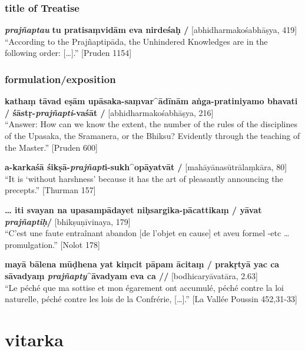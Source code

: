 \documentclass[
  letterpaper,
  DIV=11,
  numbers=noendperiod,
  oneside]{scrreprt}
\begin{document}
\hypertarget{title-of-treatise}{%
\subsection{title of Treatise}\label{title-of-treatise}}

\textbf{\emph{prajñaptau}} \textbf{tu pratisaṃvidām eva nirdeśaḥ /}
{[}abhidharmakośabhāṣya, 419{]}\\
``According to the Prajñaptipāda, the Unhindered Knowledges are in the
following order: {[}\ldots{]}.'' {[}Pruden 1154{]}

\hypertarget{formulationexposition}{%
\subsection{formulation/exposition}\label{formulationexposition}}

\textbf{kathaṃ tāvad eṣām upāsaka-saṃvar\^{}ādīnām aṅga-pratiniyamo
bhavati / śāstṛ-\emph{prajñapti}-vaśāt /} {[}abhidharmakośabhāṣya,
216{]}\\
``Answer: How can we know the extent, the number of the rules of the
disciplines of the Upasaka, the Sramanera, or the Bhiksu? Evidently
through the teaching of the Master.'' {[}Pruden 600{]}

\textbf{a-karkaśā śikṣā-\emph{prajñapt}i-sukh\^{}opāyatvāt /}
{[}mahāyānasūtrālaṃkāra, 80{]}\\
``It is `without harshness' because it has the art of pleasantly
announcing the precepts.'' {[}Thurman 157{]}

\textbf{\ldots{} iti svayan na upasampādayet niḥsargika-pācattikaṃ /
yāvat \emph{prajñaptiḥ}/} {[}bhikṣuṇīvinaya, 179{]}\\
``C'est une faute entraînant abandon {[}de l'objet en cause{]} et aveu
formel -etc \ldots{} promulgation.'' {[}Nolot 178{]}

\textbf{mayā bālena mūḍhena yat kiṃcit pāpam ācitaṃ / prakṛtyā yac ca
sāvadyaṃ \emph{prajñapty}\^{}āvadyam eva ca //} {[}bodhicaryāvatāra,
2.63{]}\\
``Le péché que ma sottise et mon égarement ont accumulé, péché contre la
loi naturelle, péché contre les lois de la Confrérie, {[}\ldots{]}.''
{[}La Vallée Poussin 452,31-33{]}


\hypertarget{vitarka}{%
\chapter{vitarka}\label{vitarka}}
\end{document}
